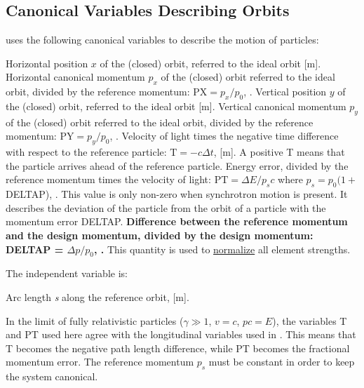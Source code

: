 \subsection{Canonical Variables Describing Orbits}
\label{subsec:tables-canon}
\madx uses the following canonical variables to describe the motion of particles: 

\begin{madlist}
	 Horizontal position $x$ of the (closed) orbit,
	referred to the ideal orbit [m].    
	 Horizontal canonical momentum $p_x$ of the
	(closed) orbit referred to the ideal orbit, divided by the
	reference momentum: $\textrm{PX} = p_x / p_0$, \cite{slac75}.   
	 Vertical position $y$ of the (closed) orbit, referred
	to the ideal orbit [m].   
	 Vertical canonical momentum $p_y$ of the (closed)
	orbit referred to the ideal orbit, divided by the reference
	momentum: $\textrm{PY} = p_y / p_0$, \cite{slac75}.   
	 Velocity of light times the negative time difference with
	respect to the reference particle: $\textrm{T} =  -  c\Delta t$, [m]. A
	positive T means that the particle arrives ahead of the reference
	particle.   
	 Energy error, divided by the reference momentum times the
	velocity of light: $\textrm{PT} = \Delta E / p_s c$ where $p_s = p_0 (1+$DELTAP), \cite{slac75}. 
	This value is only non-zero when synchrotron motion is
	present. It describes the deviation of the particle from the orbit
	of a particle with the momentum error DELTAP.   
	 \textbf{Difference between the reference momentum and the design
	momentum, divided by the design momentum: DELTAP =
	$\Delta p / p_0$, \cite{slac75}.} This quantity is used to
	\hyperref[chap:differences]{normalize} all element strengths.   
\end{madlist} 

The independent variable is: 
\begin{madlist}
    Arc length \textit{s} along the
  reference orbit, [m].    
\end{madlist} 

In the limit of fully relativistic particles ($\gamma \gg 1$, $v = c$,
$p c = E$), the variables T and PT used here agree with the
longitudinal variables used in \cite{TRANSPORT}. This means that T
becomes the negative path length difference, while PT becomes the
fractional momentum error. The reference momentum $p_s$ must be
constant in order to keep the system canonical.  


